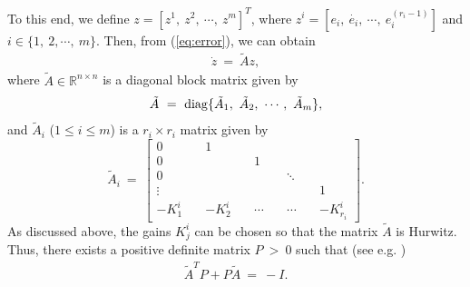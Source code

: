 \documentclass[twoside,leqno,onecolumn]{article}
\begin{document}
To this end, we define $z=[z^1,~z^2,~\cdots,~z^m]^T$, where $z^i=[e_i,~\dot{e_i},~\cdots,~e_i^{(r_i-1)}]$ and $i\in\{1,~2,\cdots,~m\}$. Then, from (\ref{eq:error}), we can obtain
\begin{align*}
\dot{z}~=~ \tilde{A} z,
\end{align*}where $\tilde{A}\in \mathbb{R}^{n\times n}$ is a diagonal block matrix given by
\begin{align}
\label{eq:tildA}
\tilde{A}~=~{\rm{diag}}\{\tilde A_1,~\tilde A_2,~\cdots,~\tilde A_m\},
\end{align}
and $\tilde A_i$ ($1\leq i\leq m$) is a $r_i\times r_i$ matrix given by
\[ \tilde{A}_i~=~\left[ \begin{array}{cccccc}
0& 1&  \\
0& &1&\\
0&&&\ddots\\
\vdots&&&&1\\
-K^i_1\quad&-K^i_2\quad&\cdots\quad&\cdots\quad&-K^i_{r_i}
\end{array} \right].\]
As discussed above, the gains $K_j^i$ can be chosen so that the
matrix $\tilde{A}$ is Hurwitz. Thus, there exists a positive
definite matrix $P~>~ 0$ such that (see e.g. \cite{Khalil02})
\begin{align}
\label{eq:lyap}
\tilde A^T P + P \tilde A ~=~-I.
\end{align} 
\end{document}
